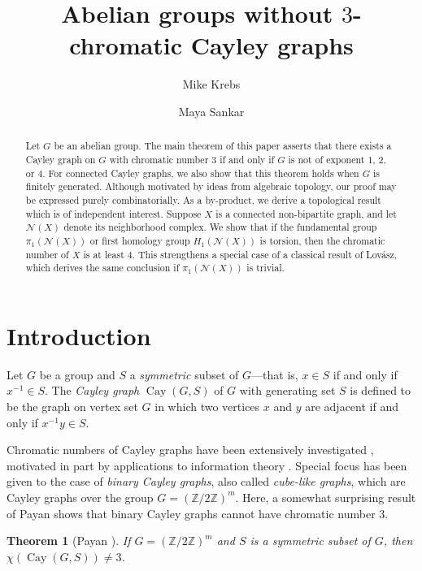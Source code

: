 \documentclass[12pt,letterpaper]{amsart}
\title{Abelian groups without $3$-chromatic Cayley graphs}
\author{Mike Krebs}
\author{Maya Sankar}
\newtheorem{theorem}{Theorem}[section]
\theoremstyle{definition}
\theoremstyle{remark}
\newcommand{\N}{{\mathcal N}}
\newcommand{\Z}{{\mathbb Z}}
\DeclareMathOperator{\Cay}{Cay}
\begin{document}
\begin{abstract}Let $G$ be an abelian group.  The main theorem of this paper asserts that there exists a Cayley graph on $G$ with chromatic number $3$ if and only if $G$ is not of exponent $1$, $2$, or $4$. For connected Cayley graphs, we also show that this theorem holds when $G$ is finitely generated.  
Although motivated by ideas from algebraic topology, our proof may be expressed purely combinatorially.
As a by-product, we derive a topological result which is of independent interest. Suppose $X$ is a connected non-bipartite graph, and let $\N(X)$ denote its neighborhood complex. We show that if the fundamental group $\pi_1(\N(X))$ or first homology group $H_1(\N(X))$ is torsion, then the chromatic number of $X$ is at least $4$. This strengthens a special case of a classical result of Lov\'asz, which derives the same conclusion if $\pi_1(\N(X))$ is trivial.  
\end{abstract}


\maketitle

\section{Introduction}

Let $G$ be a group and $S$ a \emph{symmetric} subset of $G$---that is, $x\in S$ if and only if $x^{-1}\in S$. The \emph{Cayley graph} $\Cay(G,S)$ of $G$ with generating set $S$ is defined to be the graph on vertex set $G$ in which two vertices $x$ and $y$ are adjacent if and only if $x^{-1}y\in S$. 

Chromatic numbers of Cayley graphs have been extensively investigated \cite{Alon,Cze}, motivated in part by applications to information theory \cite{AlOr,Rix}.
Special focus \cite{Kim, Kok, Lau, Ngo, Zie} has been given to the case of \emph{binary Cayley graphs}, also called \emph{cube-like graphs}, which are Cayley graphs over the group $G=(\Z/2\Z)^m$. Here, a somewhat surprising result of Payan \cite{Pay} shows that binary Cayley graphs cannot have chromatic number 3.

\begin{theorem}[Payan \cite{Pay}]\label{thm:Payan}
If $G=(\Z/2\Z)^m$ and $S$ is a symmetric subset of $G$, then $\chi(\Cay(G,S))\neq 3$.
\end{theorem}
\end{document}
